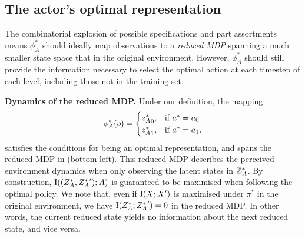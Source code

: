 \subsection{The actor's optimal representation}
%
The combinatorial explosion of possible specifications and part assortments means $\phi^*_A$ should ideally map observations to a \textit{reduced MDP} spanning a much smaller state space that in the original environment. However, $\phi^*_A$ should still provide the information necessary to select the optimal action at each timestep of each level, including those not in the training set.

\textbf{Dynamics of the reduced MDP.} Under our definition, the mapping
\begin{equation}
    \phi^*_A(o) = 
    \begin{cases}
      {z^*_A}_0, & \text{if}\ a^*=a_0 \\
      {z^*_A}_1, & \text{if}\ a^*=a_1.
    \end{cases}
\end{equation}
satisfies the conditions for being an optimal representation, and spans the reduced MDP in  (bottom left). This reduced MDP describes the perceived environment dynamics when only observing the latent states in ${{\mathbb{Z}}^*_A}$. By construction, $\text{I}(({Z^*_A}, {Z^*_A}');A)$ is guaranteed to be maximised when following the optimal policy. We note that, even if $\text{I}(X;X')$ is maximised under $\pi^*$ in the original environment, we have $\text{I}({Z^*_A};{Z^*_A}')=0$ in the reduced MDP. In other words, the current reduced state yields no information about the next reduced state, and vice versa.

